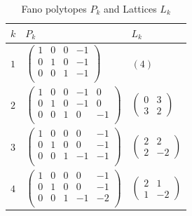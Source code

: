 \documentclass[10pt]{article}
\begin{document}
{\small
\begin{longtable}{lll}
\caption{Fano polytopes $P_k$ and Lattices $L_k$}\\
\hline
  $k$ & $P_k$  & $L_k$ \vspace{1mm}  \\
  \hline
  \endhead
\vspace{1mm}$1$ & $ \left(
\begin{array}{cccccc}
1 & 0 & 0 & -1 \\
0 & 1 & 0 & -1  \\
0 & 0 & 1 & -1  \\
\end{array}\right)$ & $(4)$ \vspace{1mm}\\
\vspace{1mm}$2$ & $ \left(
\begin{array}{cccccc}
1 & 0 & 0 & -1 & 0  \\
0 & 1 & 0 & -1 & 0  \\
0 & 0 & 1 & 0 & -1  \\
\end{array}\right)$ &$\begin{pmatrix} 0 & 3 \\ 3 & 2 \end{pmatrix}$ \vspace{1mm}\\
\vspace{1mm}$3$ &
$ \left(
\begin{array}{cccccc}
1 & 0 & 0 & 0 & -1  \\
0 & 1 & 0 & 0 & -1  \\
0 & 0 & 1 & -1 & -1  \\
\end{array}\right)$ & $\begin{pmatrix} 2 & 2 \\ 2 & -2 \end{pmatrix}$ \vspace{1mm}\\
\vspace{1mm}$4$ &$ \left(
\begin{array}{cccccc}
1 & 0 & 0 & 0 & -1  \\
0 & 1 & 0 & 0 & -1  \\
0 & 0 & 1 & -1 & -2  \\
\end{array}\right)$ & 
$\begin{pmatrix} 2 & 1 \\ 1 & -2 \end{pmatrix}$ \vspace{1mm}\\

\end{longtable}}
\end{document}
